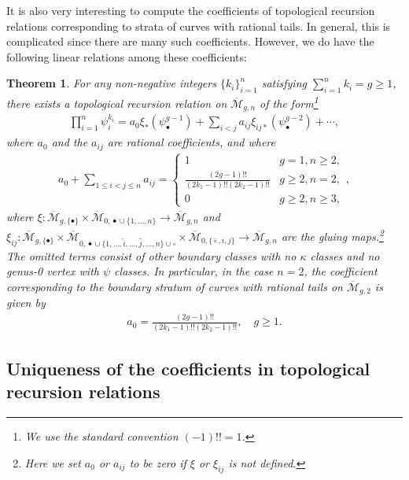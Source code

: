 \documentclass[12pt,reqno]{amsart}
\theoremstyle{plain}
\newtheorem{theorem}{Theorem}
\theoremstyle{definition}
\theoremstyle{remark}
\begin{document}
It is also very interesting to compute the coefficients of topological recursion relations corresponding to strata of curves with rational tails.
In general, this is complicated since there are many such coefficients.
However, we do have the following linear relations among these coefficients:
\begin{theorem}\label{thm:trr-g-2}
For any non-negative integers $\{k_i\}_{i=1}^{n}$ satisfying $\sum_{i=1}^{n}k_i=g\geq1$, there exists a topological recursion relation on $\overline{\mathcal{M}}_{g,n}$ of the form\footnote{We use the standard convention $(-1)!!=1$.}
\begin{align*}
  \prod_{i=1}^{n}\psi_i^{k_i}=a_0\xi_{*}(\psi_{\bullet}^{g-1})+\sum_{i<j}a_{ij}\xi_{ij*}(\psi^{g-2}_{\bullet})+\cdots,
\end{align*}
where $a_0$ and the $a_{ij}$ are rational coefficients, and where
\begin{align*}
a_0+\sum_{1\leq i<j\leq n}a_{ij}
=\begin{cases}
1 &g=1, n \ge 2,\\
\frac{(2g-1)!!}{(2k_1-1)!!(2k_2-1)!!}&g\geq2, n=2,\\
0&g\geq2, n\geq3,
\end{cases},
\end{align*}
where $\xi:\overline{\mathcal{M}}_{g,\{\bullet\}}\times\overline{\mathcal{M}}_{0,\bar{\bullet}\cup\{1,\dots,n\}}\rightarrow \overline{\mathcal{M}}_{g,n}$  and $\xi_{ij}:\overline{\mathcal{M}}_{g,\{\bullet\}}\times\overline{\mathcal{M}}_{0,\bar{\bullet}\cup\{1,\dots,\hat{i},\dots,\hat{j},\dots,n\}\cup\circ}\times\overline{\mathcal{M}}_{0,\{\bar{\circ},i,j\}}\rightarrow \overline{\mathcal{M}}_{g,n}$ are the gluing maps.\footnote{Here we set $a_0$ or $a_{ij}$ to be zero if $\xi$ or $\xi_{ij}$ is not defined.}
The omitted terms consist of other boundary classes with no $\kappa$ classes and no genus-0 vertex with $\psi$ classes.
In particular, in the case $n = 2$, the coefficient corresponding to the boundary stratum of curves with rational tails on $\overline{\mathcal{M}}_{g,2}$ is given by
\begin{align*}
a_0=\frac{(2g-1)!!}{(2k_1-1)!!(2k_2-1)!!},\quad g\geq1.
\end{align*}
\end{theorem}


\subsection{Uniqueness of the coefficients in topological recursion relations}
\end{document}
